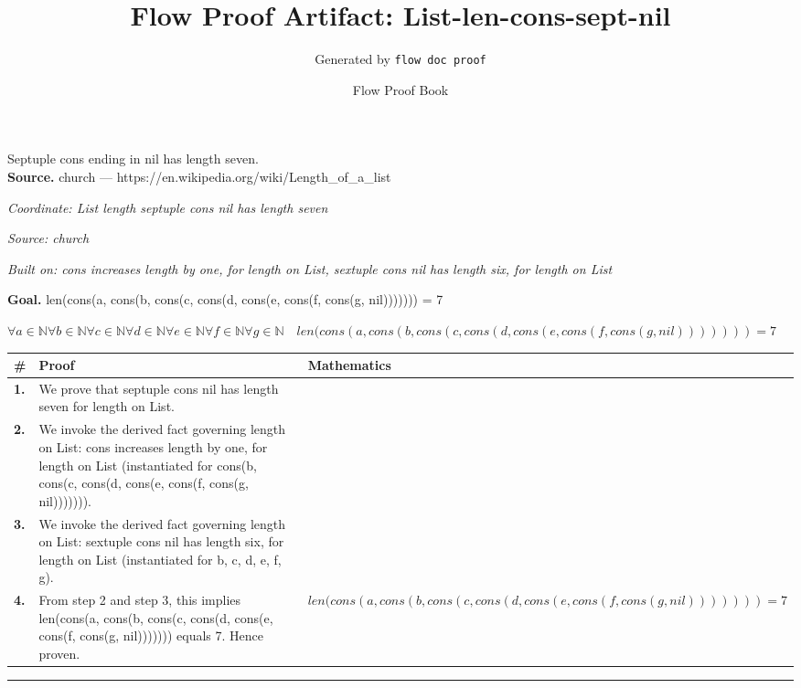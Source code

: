 \documentclass[11pt]{article}
\title{Flow Proof Artifact: List-len-cons-sept-nil}
\author{Generated by \texttt{flow doc proof}}
\date{Flow Proof Book}
\theoremstyle{definition}
\begin{document}
\maketitle
Septuple cons ending in nil has length seven.\\[0.5em]
\textbf{Source.} church — https://en.wikipedia.org/wiki/Length\_of\_a\_list\\[0.5em]
\bigskip
{}\par
\smallskip\noindent\textit{Coordinate: List \cdot length \cdot septuple cons nil has length seven}\par
\smallskip\noindent\textit{Source: church}\par
\smallskip\noindent\textit{Built on: cons increases length by one, for length on List, sextuple cons nil has length six, for length on List}\par
\medskip
\noindent\textbf{Goal.} len(cons(a, cons(b, cons(c, cons(d, cons(e, cons(f, cons(g, nil))))))) = 7\par
\noindent$\displaystyle \forall a \in \mathbb{N} \forall b \in \mathbb{N} \forall c \in \mathbb{N} \forall d \in \mathbb{N} \forall e \in \mathbb{N} \forall f \in \mathbb{N} \forall g \in \mathbb{N}\quad len(cons(a, cons(b, cons(c, cons(d, cons(e, cons(f, cons(g, nil))))))) = 7$\par
\medskip
\noindent
\begin{tabular}{@{} >{\raggedright\arraybackslash}p{} >{\raggedright\arraybackslash}p{} >{\raggedleft\arraybackslash}p{} @{}}
\textbf{\#} & \textbf{Proof} & \textbf{Mathematics} \\
\midrule
\textbf{1.} & We prove that septuple cons nil has length seven for length on List. & \\[0.45em]
\textbf{2.} & We invoke the derived fact governing length on List: cons increases length by one, for length on List (instantiated for cons(b, cons(c, cons(d, cons(e, cons(f, cons(g, nil))))))). & \\[0.45em]
\textbf{3.} & We invoke the derived fact governing length on List: sextuple cons nil has length six, for length on List (instantiated for b, c, d, e, f, g). & \\[0.45em]
\textbf{4.} & From step 2 and step 3, this implies len(cons(a, cons(b, cons(c, cons(d, cons(e, cons(f, cons(g, nil))))))) equals 7. Hence proven. & $\displaystyle len(cons(a, cons(b, cons(c, cons(d, cons(e, cons(f, cons(g, nil))))))) = 7$ \\[0.45em]
\bottomrule
\end{tabular}
\label{thm:List-length-septuple_cons_nil_has_length_seven}
\par\medskip\hrule
\end{document}
